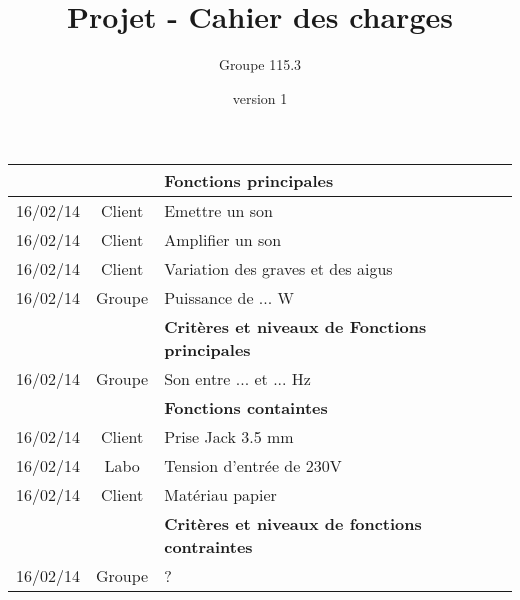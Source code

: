 \documentclass{article}
\title{Projet - Cahier des charges}
\author{Groupe 115.3}
\date{version 1}
\begin{document}
 \maketitle

\begin{table*} [h]
	
		\begin{tabular}{|l|c|l|}
		\hline
			 & & \textbf{Fonctions principales} \\
		\hline
			16/02/14 & Client & Emettre un son \\
			16/02/14 & Client & Amplifier un son \\
			16/02/14 & Client & Variation des graves et des aigus \\
			16/02/14 & Groupe & Puissance de ... W \\
		\hline
			 & & \textbf{Critères et niveaux de Fonctions principales} \\
		\hline
			16/02/14 & Groupe & Son entre ... et ... Hz \\
		\hline
			 & & \textbf{Fonctions containtes} \\
		\hline
			16/02/14 & Client & Prise Jack 3.5 mm \\
			16/02/14 & Labo & Tension d'entrée de 230V \\
			16/02/14 & Client & Matériau papier \\
		\hline
			 & & \textbf{Critères et niveaux de fonctions contraintes} \\
		\hline
			16/02/14 & Groupe & ? \\
		\hline
		\end{tabular}
		
\end{table*}
\end{document}
